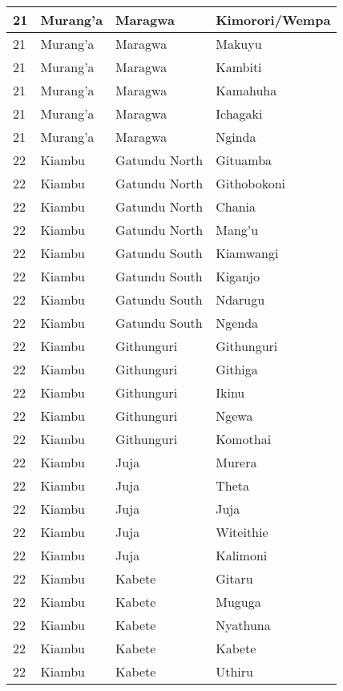 \begin{table}[!ht]
\begin{tabular}{|l|l|l|l|}
        21 & Murang’a & Maragwa & Kimorori/Wempa \\ \hline
        21 & Murang’a & Maragwa & Makuyu \\ \hline
        21 & Murang’a & Maragwa & Kambiti \\ \hline
        21 & Murang’a & Maragwa & Kamahuha \\ \hline
        21 & Murang’a & Maragwa & Ichagaki \\ \hline
        21 & Murang’a & Maragwa & Nginda \\ \hline
        22 & Kiambu & Gatundu North & Gituamba \\ \hline
        22 & Kiambu & Gatundu North & Githobokoni \\ \hline
        22 & Kiambu & Gatundu North & Chania \\ \hline
        22 & Kiambu & Gatundu North & Mang’u \\ \hline
        22 & Kiambu & Gatundu South & Kiamwangi \\ \hline
        22 & Kiambu & Gatundu South & Kiganjo \\ \hline
        22 & Kiambu & Gatundu South & Ndarugu \\ \hline
        22 & Kiambu & Gatundu South & Ngenda \\ \hline
        22 & Kiambu & Githunguri & Githunguri \\ \hline
        22 & Kiambu & Githunguri & Githiga \\ \hline
        22 & Kiambu & Githunguri & Ikinu \\ \hline
        22 & Kiambu & Githunguri & Ngewa \\ \hline
        22 & Kiambu & Githunguri & Komothai \\ \hline
        22 & Kiambu & Juja & Murera \\ \hline
        22 & Kiambu & Juja & Theta \\ \hline
        22 & Kiambu & Juja & Juja \\ \hline
        22 & Kiambu & Juja & Witeithie \\ \hline
        22 & Kiambu & Juja & Kalimoni \\ \hline
        22 & Kiambu & Kabete & Gitaru \\ \hline
        22 & Kiambu & Kabete & Muguga \\ \hline
        22 & Kiambu & Kabete & Nyathuna \\ \hline
        22 & Kiambu & Kabete & Kabete \\ \hline
        22 & Kiambu & Kabete & Uthiru \\ \hline

\end{tabular}
\end{table}
